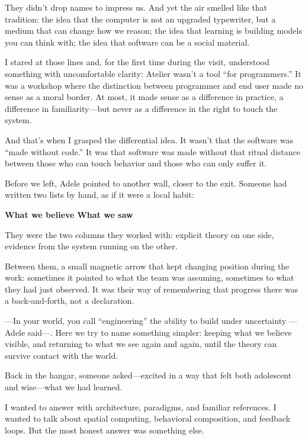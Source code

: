 \documentclass[11pt,a4paper]{article}
\begin{document}
They didn't drop names to impress us. And yet the air smelled like that
tradition: the idea that the computer is not an upgraded typewriter, but a
medium that can change how we reason; the idea that learning is building
models you can think with; the idea that software can be a social material.

I stared at those lines and, for the first time during the visit, understood
something with uncomfortable clarity: Atelier wasn't a tool ``for
programmers.'' It was a workshop where the distinction between programmer and
end user made no sense as a moral border. At most, it made sense as a
difference in practice, a difference in familiarity---but never as a
difference in the right to touch the system.

And that's when I grasped the differential idea. It wasn't that the software
was ``made without code.'' It was that software was made without that ritual
distance between those who can touch behavior and those who can only suffer
it.

Before we left, Adele pointed to another wall, closer to the exit. Someone
had written two lists by hand, as if it were a local habit:

\begin{center}
\textbf{What we believe} \hspace{3em} \textbf{What we saw}
\end{center}

They were the two columns they worked with: explicit theory on one side,
evidence from the system running on the other.

Between them, a small magnetic arrow that kept changing position during the
work: sometimes it pointed to what the team was assuming, sometimes to what
they had just observed. It was their way of remembering that progress there
was a back-and-forth, not a declaration.

---In your world, you call ``engineering'' the ability to build under
uncertainty ---Adele said---. Here we try to name something simpler: keeping
what we believe visible, and returning to what we see again and again, until
the theory can survive contact with the world.

Back in the hangar, someone asked---excited in a way that felt both
adolescent and wise---what we had learned.

I wanted to answer with architecture, paradigms, and familiar references. I
wanted to talk about spatial computing, behavioral composition, and feedback
loops. But the most honest answer was something else.
\end{document}
